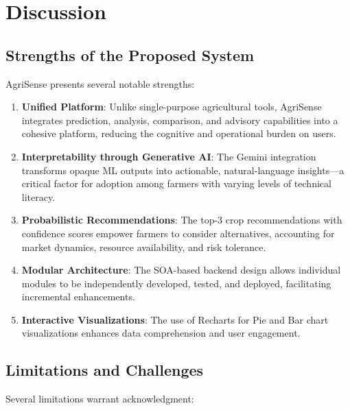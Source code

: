 
\section{Discussion}
\label{sec:discussion}

\subsection{Strengths of the Proposed System}
AgriSense presents several notable strengths:

\begin{enumerate}
    \item \textbf{Unified Platform}: Unlike single-purpose agricultural tools, AgriSense integrates prediction, analysis, comparison, and advisory capabilities into a cohesive platform, reducing the cognitive and operational burden on users.
    \item \textbf{Interpretability through Generative AI}: The Gemini integration transforms opaque ML outputs into actionable, natural-language insights---a critical factor for adoption among farmers with varying levels of technical literacy.
    \item \textbf{Probabilistic Recommendations}: The top-3 crop recommendations with confidence scores empower farmers to consider alternatives, accounting for market dynamics, resource availability, and risk tolerance.
    \item \textbf{Modular Architecture}: The SOA-based backend design allows individual modules to be independently developed, tested, and deployed, facilitating incremental enhancements.
    \item \textbf{Interactive Visualizations}: The use of Recharts for Pie and Bar chart visualizations enhances data comprehension and user engagement.
\end{enumerate}

\subsection{Limitations and Challenges}
Several limitations warrant acknowledgment:

